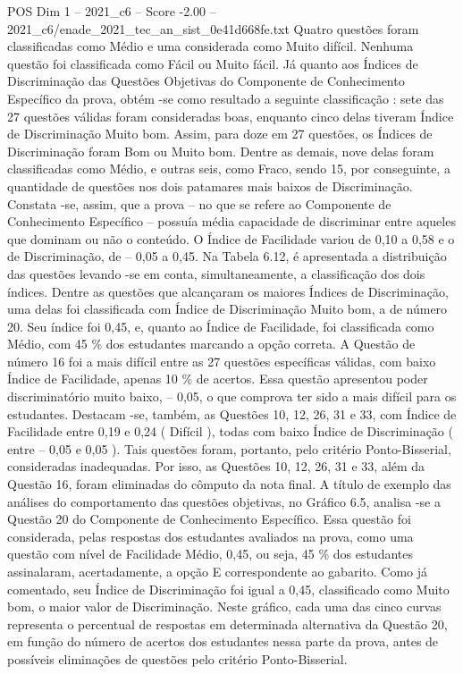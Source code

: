 \begin{textsample}{POS Dim 1 – 2021\_c6 – Score -2.00 – 2021\_c6/enade\_2021\_tec\_an\_sist\_0e41d668fe.txt}
Quatro questões foram classificadas como Médio e uma considerada como Muito difícil.
Nenhuma questão foi classificada como Fácil ou Muito fácil.
Já quanto aos Índices de Discriminação das Questões Objetivas do Componente de Conhecimento Específico da prova, obtém -se como resultado a seguinte classificação : sete das 27 questões válidas foram consideradas boas, enquanto cinco delas tiveram Índice de Discriminação Muito bom.
Assim, para doze em 27 questões, os Índices de Discriminação foram Bom ou Muito bom.
Dentre as demais, nove delas foram classificadas como Médio, e outras seis, como Fraco, sendo 15, por conseguinte, a quantidade de questões nos dois patamares mais baixos de Discriminação.
Constata -se, assim, que a prova – no que se refere ao Componente de Conhecimento Específico – possuía média capacidade de discriminar entre aqueles que dominam ou não o conteúdo.
O Índice de Facilidade variou de 0,10 a 0,58 e o de Discriminação, de – 0,05 a 0,45.
Na Tabela 6.12, é apresentada a distribuição das questões levando -se em conta, simultaneamente, a classificação dos dois índices.
Dentre as questões que alcançaram os maiores Índices de Discriminação, uma delas foi classificada com Índice de Discriminação Muito bom, a de número 20.
Seu índice foi 0,45, e, quanto ao Índice de Facilidade, foi classificada como Médio, com 45 \% dos estudantes marcando a opção correta.
A Questão de número 16 foi a mais difícil entre as 27 questões específicas válidas, com baixo Índice de Facilidade, apenas 10 \% de acertos.
Essa questão apresentou poder discriminatório muito baixo, – 0,05, o que comprova ter sido a mais difícil para os estudantes.
Destacam -se, também, as Questões 10, 12, 26, 31 e 33, com Índice de Facilidade entre 0,19 e 0,24 ( Difícil ), todas com baixo Índice de Discriminação ( entre – 0,05 e 0,05 ).
Tais questões foram, portanto, pelo critério Ponto-Bisserial, consideradas inadequadas.
Por isso, as Questões 10, 12, 26, 31 e 33, além da Questão 16, foram eliminadas do cômputo da nota final.
A título de exemplo das análises do comportamento das questões objetivas, no Gráfico 6.5, analisa -se a Questão 20 do Componente de Conhecimento Específico.
Essa questão foi considerada, pelas respostas dos estudantes avaliados na prova, como uma questão com nível de Facilidade Médio, 0,45, ou seja, 45 \% dos estudantes assinalaram, acertadamente, a opção E correspondente ao gabarito.
Como já comentado, seu Índice de Discriminação foi igual a 0,45, classificado como Muito bom, o maior valor de Discriminação.
Neste gráfico, cada uma das cinco curvas representa o percentual de respostas em determinada alternativa da Questão 20, em função do número de acertos dos estudantes nessa parte da prova, antes de possíveis eliminações de questões pelo critério Ponto-Bisserial.

\end{textsample}
